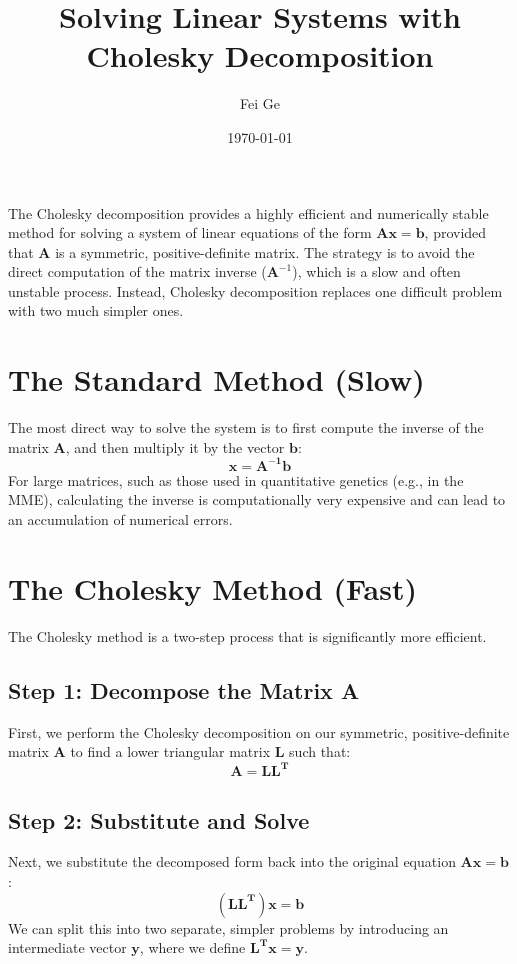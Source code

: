 \documentclass{article}
\title{Solving Linear Systems with Cholesky Decomposition}
\author{Fei Ge}
\date{\today}
\begin{document}
\maketitle

The Cholesky decomposition provides a highly efficient and numerically stable method for solving a system of linear equations of the form $\mathbf{Ax = b}$, provided that $\mathbf{A}$ is a symmetric, positive-definite matrix. The strategy is to avoid the direct computation of the matrix inverse ($\mathbf{A}^{-1}$), which is a slow and often unstable process. Instead, Cholesky decomposition replaces one difficult problem with two much simpler ones.

\section{The Standard Method (Slow)}

The most direct way to solve the system is to first compute the inverse of the matrix $\mathbf{A}$, and then multiply it by the vector $\mathbf{b}$:
\[ \mathbf{x = A^{-1}b} \]
For large matrices, such as those used in quantitative genetics (e.g., in the MME), calculating the inverse is computationally very expensive and can lead to an accumulation of numerical errors.

\section{The Cholesky Method (Fast)}

The Cholesky method is a two-step process that is significantly more efficient.

\subsection{Step 1: Decompose the Matrix A}
First, we perform the Cholesky decomposition on our symmetric, positive-definite matrix $\mathbf{A}$ to find a lower triangular matrix $\mathbf{L}$ such that:
\[ \mathbf{A = LL^T} \]

\subsection{Step 2: Substitute and Solve}
Next, we substitute the decomposed form back into the original equation $\mathbf{Ax = b}$:
\[ \mathbf{(LL^T)x = b} \]
We can split this into two separate, simpler problems by introducing an intermediate vector $\mathbf{y}$, where we define $\mathbf{L^T x = y}$.
\end{document}
